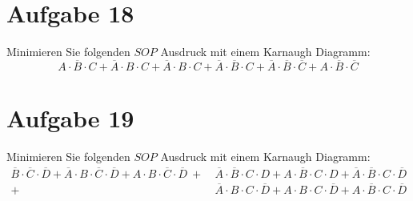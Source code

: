 \documentclass[10pt, oneside]{article}
\begin{document}
\section{Aufgabe 18}

Minimieren Sie folgenden $SOP$ Ausdruck mit einem Karnaugh Diagramm:
\begin{equation*}
    A \cdot \overline{B} \cdot C + \overline{A} \cdot B \cdot C + \overline{A} \cdot B \cdot C + \overline{A} \cdot \overline{B} \cdot C + \overline{A} \cdot \overline{B} \cdot \overline{C} + A \cdot \overline{B} \cdot \overline{C}
\end{equation*}

\section{Aufgabe 19}

Minimieren Sie folgenden $SOP$ Ausdruck mit einem Karnaugh Diagramm:
\begin{align*}
    \overline{B} \cdot \overline{C} \cdot \overline{D} + \overline{A} \cdot B \cdot \overline{C} \cdot \overline{D} + A \cdot B \cdot \overline{C} \cdot \overline{D} \ +\ &\overline{A} \cdot \overline{B} \cdot C \cdot D + A \cdot \overline{B} \cdot C \cdot D + \overline{A} \cdot \overline{B} \cdot C \cdot \overline{D} \\
                                                                                                                                                                                                                            +\ &\overline{A} \cdot B \cdot C \cdot \overline{D} + A \cdot B \cdot C \cdot \overline{D} + A \cdot \overline{B} \cdot C \cdot \overline{D}
\end{align*}
\end{document}
